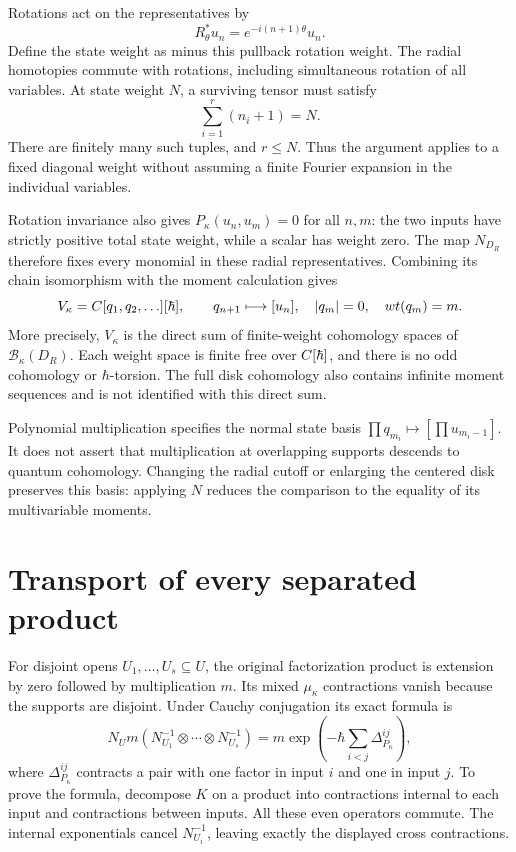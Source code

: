 Rotations act on the representatives by
\[
 R_\theta^*u_n=e^{-i(n+1)\theta}u_n.
\]
Define the state weight as minus this pullback rotation weight.
The radial homotopies commute with rotations, including simultaneous
rotation of all variables.  At state weight $N$, a surviving tensor
must satisfy
\[
 \sum_{i=1}^r(n_i+1)=N.
\]
There are finitely many such tuples, and $r\le N$.  Thus the argument
applies to a fixed diagonal weight without assuming a finite Fourier
expansion in the individual variables.

Rotation invariance also gives $P_\kappa(u_n,u_m)=0$ for all $n,m$:
the two inputs have strictly positive total state weight, while a
scalar has weight zero.  The map $N_{D_R}$ therefore fixes every
monomial in these radial representatives.  Combining its chain
isomorphism with the moment calculation gives
\[
 V_\kappa=C[q_1,q_2,\ldots][\hbar],\qquad
 q_{n+1}\longmapsto[u_n],\quad
 |q_m|=0,\quad wt(q_m)=m.
\]
More precisely, $V_\kappa$ is the direct sum of finite-weight
cohomology spaces of $\mathcal B_\kappa(D_R)$.  Each weight space is
finite free over $C[\hbar]$, and there is no odd cohomology or
$\hbar$-torsion.  The full disk cohomology also contains infinite
moment sequences and is not identified with this direct sum.

Polynomial multiplication specifies the normal state basis
$\prod q_{m_i}\mapsto[\prod u_{m_i-1}]$.  It does not assert that
multiplication at overlapping supports descends to quantum
cohomology.  Changing the radial cutoff or enlarging the centered
disk preserves this basis: applying $N$ reduces the comparison to
the equality of its multivariable moments.

\section{Transport of every separated product}

For disjoint opens $U_1,\ldots,U_s\subseteq U$, the original
factorization product is extension by zero followed by multiplication
$m$.  Its mixed $\mu_\kappa$ contractions vanish because the supports
are disjoint.  Under Cauchy conjugation its exact formula is
\[
 N_Um(N_{U_1}^{-1}\otimes\cdots\otimes N_{U_s}^{-1})
   =m\exp\left(-\hbar\sum_{i<j}\Delta_{P_\kappa}^{ij}\right),
\]
where $\Delta_{P_\kappa}^{ij}$ contracts a pair with one factor in
input $i$ and one in input $j$.  To prove the formula, decompose $K$
on a product into contractions internal to each input and contractions
between inputs.  All these even operators commute.  The internal
exponentials cancel $N_{U_i}^{-1}$, leaving exactly the displayed
cross contractions.

